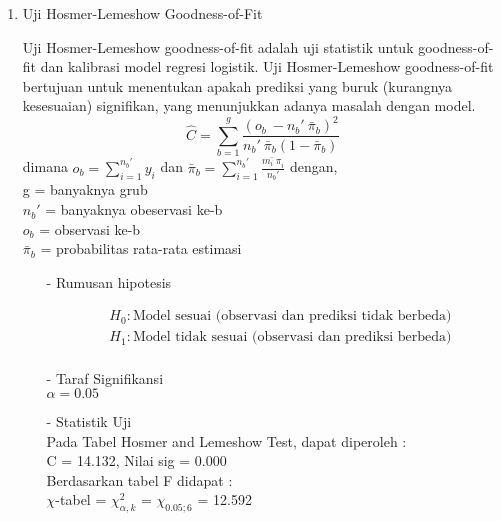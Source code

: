 \begin{enumerate}
    \item Uji Hosmer-Lemeshow Goodness-of-Fit
    \begin{sloppypar}
        Uji Hosmer-Lemeshow goodness-of-fit adalah uji statistik untuk goodness-of-fit dan kalibrasi model regresi logistik. Uji Hosmer-Lemeshow goodness-of-fit bertujuan untuk menentukan apakah prediksi yang buruk (kurangnya kesesuaian) signifikan, yang menunjukkan adanya masalah dengan model. $$\hat{C} = \sum_{b=1}^{g} \frac{(o_b\ - n_b'\ \bar{\pi}_b)^2}{n_b'\ \bar{\pi}_b (1 - \bar{\pi}_b)}$$
        dimana $o_b = \sum_{i=1}^{n_b'} y_i$ dan $\bar{\pi}_b = \sum_{i=1}^{n_b'} \frac{\bar{m_i\ \pi}_i}{n_b'}$
        dengan, \\g = banyaknya grub \\$n_b'$ = banyaknya obeservasi ke-b\\$o_b$ = observasi ke-b \\$\bar{\pi}_b$ = probabilitas rata-rata estimasi
    \end{sloppypar}
    \begin{test}{
    \begin{enumerate}
        \item[-] Rumusan hipotesis \\
        \begin{fleqn}[\parindent]
            \begin{equation*}
            \begin{split}
            &H_0 : \text{Model sesuai (observasi dan prediksi tidak berbeda)} \\ 
            &H_1 : \text{Model tidak sesuai (observasi dan prediksi berbeda)} \\
            \end{split}
            \end{equation*}
        \end{fleqn}
    
        \item[-] Taraf Signifikansi \\
        $\alpha = 0.05$
    
        \item[-] Statistik Uji \\
        Pada Tabel Hosmer and Lemeshow Test, dapat diperoleh : \\
        C = 14.132, Nilai sig = 0.000 \\
        Berdasarkan tabel F didapat : \\
        $\chi$-tabel = $\chi_{\alpha, k}^2$ = $\chi_{0.05; 6}$ = 12.592
    

\end{enumerate}}
\end{test}
\end{enumerate}
